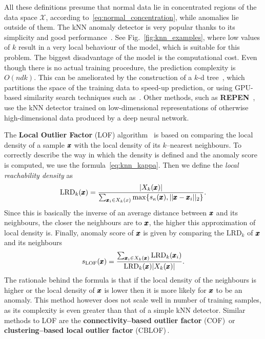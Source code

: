 All these definitions presume that normal data lie in concentrated regions of the data space $\mathcal{X}$, according to~\eqref{eq:normal_concentration}, while anomalies lie outside of them. The kNN anomaly detector is very popular thanks to its simplicity and good performance~\cite{campos2016evaluation}. See Fig.~\ref{fig:knn_examples}, where low values of $k$ result in a very local behaviour of the model, which is suitable for this problem. The biggest disadvantage of the model is the computational cost. Even though there is no actual training procedure, the prediction complexity is $O(ndk)$. This can be ameliorated by the construction of a $k$-d tree~\cite{bentley1975multidimensional}, which partitions the space of the training data to speed-up prediction, or using GPU-based similarity search techniques such as~\cite{johnson2019billion}. Other methods, such as \textbf{REPEN}~\cite{pangLearningRepresentationsUltrahighdimensional2018}, use the kNN detector trained on low-dimensional representations of otherwise high-dimensional data produced by a deep neural network.

The \textbf{Local Outlier Factor} (LOF) algorithm~\cite{breunig2000lof} is based on comparing the local density of a sample $\pmb{{x}}$ with the local density of its $k$--nearest neighbours. To correctly describe the way in which the density is defined and the anomaly score is computed, we use the formula~\eqref{eq:knn_kappa}. Then we define the \textit{local reachability density} as 
\begin{equation}
  \text{LRD}_k(\pmb{{x}})=\frac{|X_k(\pmb{{x}})|}{\sum_{\pmb{{x}}_i\in X_k(x)} \max \lbrace s_{\kappa}(\pmb{{x}}), \vert \vert \pmb{{x}} - \pmb{{x}}_i \vert \vert_2 \rbrace }.
\end{equation}
Since this is basically the inverse of an average distance between $\pmb{{x}}$ and its neighbours, the closer the neighbours are to $\pmb{{x}}$, the higher this approximation of local density is. Finally, anomaly score of $\pmb{{x}}$ is given by comparing the $\text{LRD}_k$ of $\pmb{{x}}$ and its neighbours 
\begin{equation}
  s_{\text{LOF}}(\pmb{{x}})=\frac{\sum_{\pmb{{x}}_i\in X_k(\pmb{{x}})} \text{LRD}_k(\pmb{{x}}_i)}{\text{LRD}_k(\pmb{{x}}) |X_k(\pmb{{x}})|}.
\end{equation}
The rationale behind the formula is that if the local density of the neighbours is higher or the local density of $\pmb{{x}}$ is lower then it is more likely for $\pmb{{x}}$ to be an anomaly. This method however does not scale well in number of training samples, as its complexity is even greater than that of a simple kNN detector. Similar methods to LOF are the \textbf{connectivity--based outlier factor} (COF)\,\cite{tang2002enhancing} or \textbf{clustering--based local outlier factor} (CBLOF)\,\cite{he2003discovering}.


